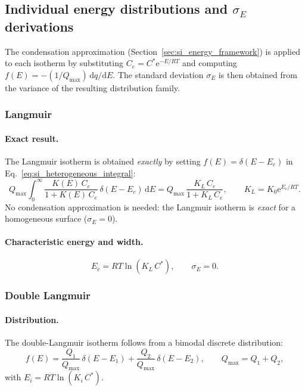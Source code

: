 \documentclass[journal=jacsat,manuscript=article]{achemso}
\begin{document}
\subsection{Individual energy distributions and $\sigma_E$ derivations}
\label{sec:si_individual_distributions}

The condensation approximation (Section~\ref{sec:si_energy_framework}) is applied
to each isotherm by substituting $C_e = C^{\ast}\mathrm{e}^{-E/RT}$ and computing
$f(E) = -(1/Q_{\max})\,\mathrm{d}q/\mathrm{d}E$. The standard deviation $\sigma_E$
is then obtained from the variance of the resulting distribution family.

\subsubsection{Langmuir}

\paragraph{Exact result.}
The Langmuir isotherm is obtained \emph{exactly} by setting
$f(E) = \delta(E-E_c)$ in Eq.~\eqref{eq:si_heterogeneous_integral}:
\begin{equation}
	Q_{\max}\int_0^{\infty}\frac{K(E)\,C_e}{1+K(E)\,C_e}
	\,\delta(E-E_c)\,\mathrm{d}E
	= Q_{\max}\,\frac{K_L\,C_e}{1+K_L\,C_e},
	\qquad K_L = K_0\mathrm{e}^{E_c/RT}.
\end{equation}
No condensation approximation is needed: the Langmuir isotherm is \emph{exact}
for a homogeneous surface ($\sigma_E = 0$).

\paragraph{Characteristic energy and width.}
\begin{equation}
	E_c = RT\ln(K_L\,C^{\ast}), \qquad \sigma_E = 0.
\end{equation}

\subsubsection{Double Langmuir}

\paragraph{Distribution.}
The double-Langmuir isotherm follows from a bimodal discrete distribution:
\begin{equation}
	f(E) = \frac{Q_1}{Q_{\max}}\,\delta(E-E_1)
	     + \frac{Q_2}{Q_{\max}}\,\delta(E-E_2),
	\qquad Q_{\max} = Q_1+Q_2,
\end{equation}
with $E_i = RT\ln(K_i\,C^{\ast})$.
\end{document}
